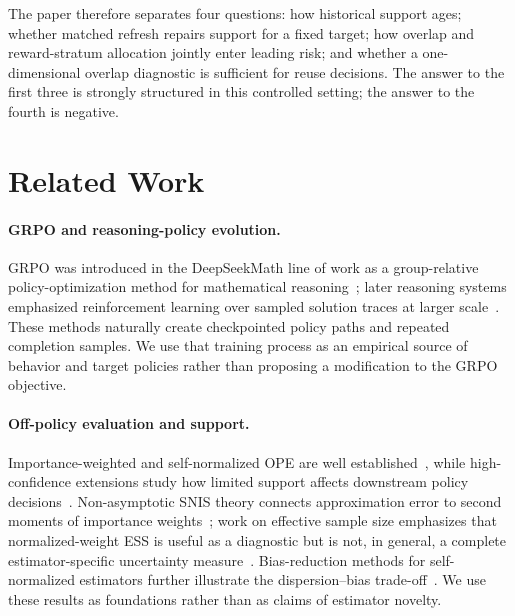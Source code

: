 \documentclass[10pt]{article}
\theoremstyle{remark}
\begin{document}
The paper therefore separates four questions: how historical support ages; whether matched refresh repairs support for a fixed target; how overlap and reward-stratum allocation jointly enter leading risk; and whether a one-dimensional overlap diagnostic is sufficient for reuse decisions. The answer to the first three is strongly structured in this controlled setting; the answer to the fourth is negative.

\section{Related Work}
\paragraph{GRPO and reasoning-policy evolution.}
GRPO was introduced in the DeepSeekMath line of work as a group-relative policy-optimization method for mathematical reasoning~\cite{shao2024deepseekmath}; later reasoning systems emphasized reinforcement learning over sampled solution traces at larger scale~\cite{deepseek2025r1}. These methods naturally create checkpointed policy paths and repeated completion samples. We use that training process as an empirical source of behavior and target policies rather than proposing a modification to the GRPO objective.

\paragraph{Off-policy evaluation and support.}
Importance-weighted and self-normalized OPE are well established~\cite{dudik2011dr,jiang2016dr,swaminathan2015selfnorm}, while high-confidence extensions study how limited support affects downstream policy decisions~\cite{thomas2015hcpi,kuzborskij2021confident}. Non-asymptotic SNIS theory connects approximation error to second moments of importance weights~\cite{agapiou2017}; work on effective sample size emphasizes that normalized-weight ESS is useful as a diagnostic but is not, in general, a complete estimator-specific uncertainty measure~\cite{martino2017ess,elvira2022ess}. Bias-reduction methods for self-normalized estimators further illustrate the dispersion--bias trade-off~\cite{cardoso2022brsnis}. We use these results as foundations rather than as claims of estimator novelty.
\end{document}
